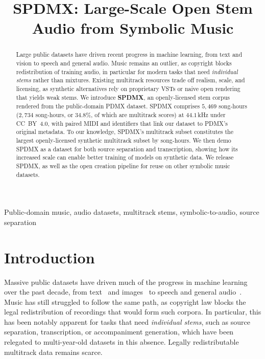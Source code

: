 \documentclass{article}
\title{SPDMX: Large-Scale Open Stem Audio from Symbolic Music}
\newcommand{\demourl}{https://pnlong.github.io/SPDMX/}
\begin{document}
\maketitle

\begin{abstract}
Large public datasets have driven recent progress in machine learning, from text and vision to speech and general audio.
Music remains an outlier, as copyright blocks redistribution of training audio, in particular for modern tasks that need \emph{individual stems} rather than mixtures.
Existing multitrack resources trade off realism, scale, and licensing, as synthetic alternatives rely on proprietary VSTs or naive open rendering that yields weak stems.
We introduce \textbf{SPDMX}, an openly-licensed stem corpus rendered from the public-domain PDMX dataset.
SPDMX comprises $5{,}469$ song-hours ($2{,}734$ song-hours, or $34.8\%$, of which are multitrack scores) at $44.1$\,kHz under CC~BY~4.0, with paired MIDI and identifiers that link our dataset to PDMX's original metadata.
To our knowledge, SPDMX's multitrack subset constitutes the largest openly-licensed synthetic multitrack subset by song-hours.
We then demo SPDMX as a dataset for both source separation and transcription, showing how its increased scale can enable better training of models on synthetic data.
We release SPDMX, as well as the open creation pipeline for reuse on other symbolic music datasets.\footnotemark[1]
\end{abstract}
\footnotetext[1]{\url{\demourl}}

\begin{keywords}
Public-domain music, audio datasets, multitrack stems, symbolic-to-audio,
source separation
\end{keywords}

\vspace{-1em}

\section{Introduction}
\label{sec:intro}

Massive public datasets have driven much of the progress in machine learning over the past decade, from text~\cite{raffel2020exploring,gao2020pile} and images~\cite{deng2009imagenet,schuhmann2022laion} to speech and general audio~\cite{gemmeke2017audio,panayotov2015librispeech}.
Music has still struggled to follow the same path, as copyright law blocks the legal redistribution of recordings that would form such corpora.
In particular, this has been notably apparent for tasks that need \emph{individual stems}, such as source separation, transcription, or accompaniment generation, which have been relegated to multi-year-old datasets in this absence.
Legally redistributable multitrack data remains scarce.
\end{document}
